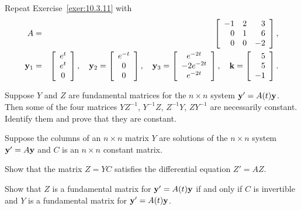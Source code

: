 \begin{exerciselist}
  \item\label{exer:10.3.13} Repeat Exercise~\ref{exer:10.3.11} with
  \begin{eqnarray*}
    A&=&\left[\begin{array}{rrr} -1&2&3\\0&1&6\\0&0&-2\end{array}\right],\\ {\bf y}_{1}&=&\left[
    \begin{array}{c}
      e^{t} \\
      e^{t} \\
      0
    \end{array}\right], \quad {\bf y}_{2}=\left[
    \begin{array}{c}
      e^{-t} \\
      0      \\
      0
    \end{array}\right], \quad{\bf y}_{3}=\left[
    \begin{array}{c}
      e^{-2t}   \\
      -2e^{-2t} \\
      e^{-2t}
    \end{array}\right],\quad {\bf k}=\left[
    \begin{array}{r}
      5  \\
      5  \\
      -1
    \end{array}\right].
  \end{eqnarray*}

  \item\label{exer:10.3.14} Suppose $Y$ and $Z$ are fundamental matrices for the $n\times n$ system
        ${\bf y}'=A(t){\bf y}$. Then some of the four matrices $YZ^{-1}$, $Y^{-1}Z$, $Z^{-1}Y$,
        $ZY^{-1}$ are necessarily constant. Identify them and prove that they are constant.

  \item\label{exer:10.3.15} Suppose the columns of an $n\times n$ matrix $Y$ are solutions of the
        $n\times n$ system ${\bf y}'=A{\bf y}$ and $C$ is an $n\times n$ constant matrix.

  \begin{alist}
    \item %
    Show that the matrix $Z=YC$ satisfies the differential equation $Z'=AZ$.

    \item %
    Show that $Z$ is a fundamental matrix for ${\bf y}'=A(t){\bf y}$ if and only if $C$ is
    invertible and $Y$ is a fundamental matrix for ${\bf y}'=A(t){\bf y}$.
  \end{alist}


\end{exerciselist}
